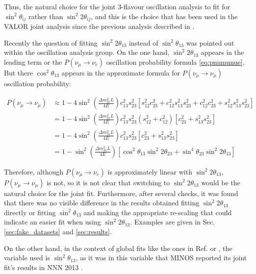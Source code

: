 Thus, the natural choice for the joint 3-flavour oscillation analysis to fit for 
$\sin^{2}\theta_{ij}$ rather than $\sin^{2}2\theta_{ij}$, and this is the choice that has been used in the VALOR joint analysis since the previous analysis described in \cite{OurJointAnalysis}.

Recently the question of fitting $\sin^{2}2\theta_{13}$ instead of $\sin^{2}\theta_{13}$ was pointed out within the oscillation analysis group. 
On the one hand, $\sin^{2}2\theta_{13}$ appears in the leading term or the $P(\nu_{\mu}\rightarrow\nu_{e})$ oscillation probability formula \ref{eq:pnumunue}.
But there $\cos^{2}\theta_{13}$ appears in the approximate formula for $P(\nu_{\mu}\rightarrow\nu_{\mu})$ oscillation probability:

\begin{equation}
\begin{split}
P(\nu_{\mu}\rightarrow\nu_{\mu}) &\approx 1 - 4 \sin^{2}\left(\frac{\Delta m_{31}^{2} L}{4E}\right) c_{13}^{2}s_{23}^{2} \left[ s_{12}^{2}c_{23}^{2}+c_{12}^{2}s_{13}^{2}s_{23}^{2}+c_{12}^{2}c_{23}^{2}+s_{12}^{2}s_{13}^{2}s_{23}^{2}\right] \\
&= 1 - 4 \sin^{2}\left(\frac{\Delta m_{31}^{2} L}{4E}\right) c_{13}^{2}s_{23}^{2} \left(s_{12}^{2} + c_{12}^{2} \right) \left[ c_{23}^{2} + s_{13}^{2}s_{23}^{2} \right] \\
&= 1 - 4 \sin^{2}\left(\frac{\Delta m_{31}^{2} L}{4E}\right) c_{13}^{2}s_{23}^{2} \left[ c_{23}^{2} + s_{13}^{2}s_{23}^{2}\right]\\
&= 1 - \sin^{2}\left(\frac{\Delta m_{31}^{2} L}{4E}\right) \left[ \cos^{2}\theta_{13}\sin^{2}2\theta_{23} +\sin^{4}\theta_{23}\sin^{2}2\theta_{13} \right]
\end{split}
\label{numusurv3fapprox}
\end{equation}

Therefore, although $P(\nu_{\mu}\rightarrow\nu_{e})$ is approximately linear with $\sin^{2}2\theta_{13}$, $P(\nu_{\mu}\rightarrow\nu_{\mu})$ is not, so it is not clear that switching to $\sin^{2}2\theta_{13}$ would be the natural choice for the joint fit.
Furthermore, after several checks, it was found that there was no visible difference in the results obtained fitting $\sin^{2}2\theta_{13}$ directly or fitting $\sin^{2}\theta_{13}$ and making the appropriate re-scaling that could indicate an easier fit when using $\sin^{2}2\theta_{13}$. Examples are given in Sec. \ref{sec:fake_datasets} and \ref{sec:results}.

On the other hand, in the context of global fits like the ones in Ref. \cite{LisiGlobalAnalysis} or \cite{ConchaMaltoniGlobalAnalysis}, the variable used is $\sin^{2}\theta_{13}$, as it was in this variable that MINOS reported its joint fit's results in NNN 2013 \cite{MINOSjoint}.


